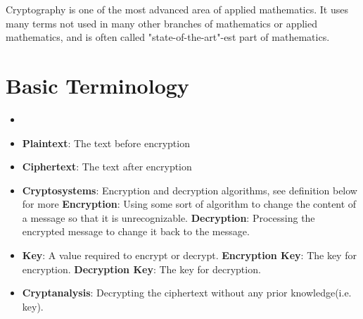 \documentclass{report}
\begin{document}
	Cryptography is one of the most advanced area of applied mathematics. It uses many terms not used in many other branches of mathematics or applied mathematics, and is often called "state-of-the-art"-est part of mathematics.
	\section{Basic Terminology}
		\begin{defn}
			\begin{itemize}
				\item[]
				\item \textbf{Plaintext}: The text before encryption
				\item \textbf{Ciphertext}: The text after encryption
				\item \textbf{Cryptosystems}: Encryption and decryption algorithms, see definition below for more
				\subitem \textbf{Encryption}: Using some sort of algorithm to change the content of a message so that it is unrecognizable.
				\subitem \textbf{Decryption}: Processing the encrypted message to change it back to the message.
				\item \textbf{Key}: A value required to encrypt or decrypt.
				\subitem \textbf{Encryption Key}: The key for encryption.
				\subitem \textbf{Decryption Key}: The key for decryption.
				\item \textbf{Cryptanalysis}: Decrypting the ciphertext without any prior knowledge(i.e. key).
			\end{itemize}
		\end{defn}
		
\end{document}
